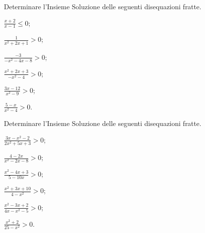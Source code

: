 \begin{esercizio}[\Ast]
 \label{ese:4.60}
Determinare l'Insieme Soluzione delle seguenti disequazioni fratte.
\begin{multicols}{3}
\begin{enumeratea}
\item $\frac{x+2}{x-1}\le 0$;
\item $\frac 1{x^2+2x+1}>0$;
\item $\frac{-3}{-x^2-4x-8}>0$;
\item $\frac{x^2+2x+3}{-x^2-4}>0$;
\item $\frac{3x-12}{x^2-9}>0$;
\item $\frac{5-x}{x^2-4}>0$.
\end{enumeratea}
\end{multicols}
\end{esercizio}

\begin{esercizio}[\Ast]
 \label{ese:4.61}
Determinare l'Insieme Soluzione delle seguenti disequazioni fratte.
\begin{multicols}{3}
\begin{enumeratea}
\item $\frac{3x-x^2-2}{2x^2+5x+3}>0$;
\item $\frac{4-2x}{x^2-2x-8}>0$;
\item $\frac{x^2-4x+3}{5-10x}>0$;
\item $\frac{x^2+3x+10}{4-x^2}>0$;
\item $\frac{x^2-3x+2}{4x-x^2-5}>0$;
\item $\frac{x^2+2}{25-x^2}>0$.
\end{enumeratea}
\end{multicols}
\end{esercizio}

